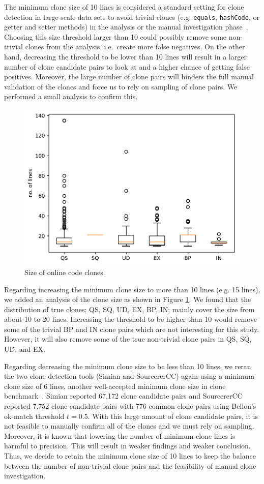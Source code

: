 \documentclass[a4paper,twoside,10pt]{reviewresponse}
\begin{document}
The minimum clone size of 10 lines is considered a standard setting for clone detection in large-scale data sets to avoid trivial clones (e.g. \texttt{equals}, \texttt{hashCode}, or getter and setter methods) in the analysis or the manual investigation phase~\citep{Sajnani2016}. 
Choosing this size threshold larger than 10 could possibly remove some non-trivial clones from the analysis, i.e.~create more false negatives.
On the other hand, decreasing the threshold to be lower than 10 lines will result in a larger number of clone candidate pairs to look at and a higher chance of getting false positives. Moreover, the large number of clone pairs will hinders the full manual validation of the clones and force us to rely on sampling of clone pairs. We performed a small analysis to confirm this.

\begin{figure}[H]
	\centering
	\includegraphics[width=0.5\linewidth]{../boxplot_clone_size}
	\caption{Size of online code clones.}
	\label{fig:boxplotclonesize}
\end{figure}

Regarding increasing the minimum clone size to more than 10 lines (e.g. 15 lines), we added an analysis of the clone size as shown in Figure \ref{fig:boxplotclonesize}. We found that the distribution of true clones; QS, SQ, UD, EX, BP, IN; mainly cover the size from about 10 to 20 lines. Increasing the threshold to be higher than 10 would remove some of the trivial BP and IN clone pairs which are not interesting for this study. However, it will also remove some of the true non-trivial clone pairs in QS, SQ, UD, and EX.

Regarding decreasing the minimum clone size to be less than 10 lines, we reran the two clone detection tools (Simian and SourcererCC) again using a minimum clone size of 6 lines, another well-accepted minimum clone size in clone benchmark~\citep{Bellon2007}. Simian reported 67,172 clone candidate pairs and SourcererCC reported 7,752 clone candidate pairs with 776 common clone pairs using Bellon's ok-match threshold $t=0.5$. With this large amount of clone candidate pairs, it is not feasible to manually confirm all of the clones and we must rely on sampling. Moreover, it is known that lowering the number of minimum clone lines is harmful to precision. This will result in weaker findings and weaker conclusion. Thus, we decide to retain the minimum clone size of 10 lines to keep the balance between the number of non-trivial clone pairs and the feasibility of manual clone investigation.
\end{document}

